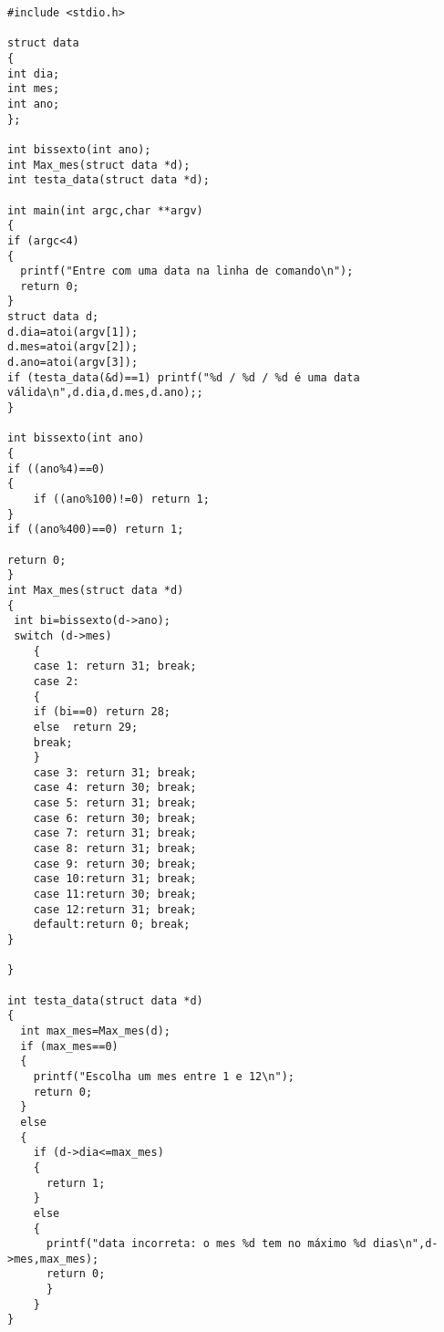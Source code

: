 \begin{verbatim}
#include <stdio.h>

struct data
{
int dia;
int mes;
int ano;
};

int bissexto(int ano);
int Max_mes(struct data *d);
int testa_data(struct data *d);

int main(int argc,char **argv)
{
if (argc<4) 
{
  printf("Entre com uma data na linha de comando\n");
  return 0;
}
struct data d;
d.dia=atoi(argv[1]);
d.mes=atoi(argv[2]);
d.ano=atoi(argv[3]);
if (testa_data(&d)==1) printf("%d / %d / %d é uma data válida\n",d.dia,d.mes,d.ano);;
}

int bissexto(int ano)
{
if ((ano%4)==0)
{
	if ((ano%100)!=0) return 1;
}
if ((ano%400)==0) return 1;

return 0;
}
int Max_mes(struct data *d)
{
 int bi=bissexto(d->ano);
 switch (d->mes)
	{
	case 1:	return 31; break;
	case 2:	
	{	
	if (bi==0) return 28;
	else  return 29;
	break;
	}
	case 3:	return 31; break;
	case 4:	return 30; break;
	case 5:	return 31; break;
	case 6:	return 30; break;
	case 7:	return 31; break;
	case 8:	return 31; break;
	case 9:	return 30; break;
	case 10:return 31; break;
	case 11:return 30; break;
	case 12:return 31; break;
	default:return 0; break;		
}

}

int testa_data(struct data *d)
{
  int max_mes=Max_mes(d);
  if (max_mes==0)
  {
    printf("Escolha um mes entre 1 e 12\n");	
    return 0;
  }
  else
  {
    if (d->dia<=max_mes)
    {
      return 1;
    }
    else
    {
      printf("data incorreta: o mes %d tem no máximo %d dias\n",d->mes,max_mes);
      return 0;
      }
    }
}
\end{verbatim}

